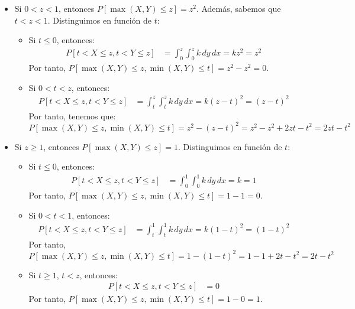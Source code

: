 \documentclass[12pt]{article}
\begin{document}
\begin{ejercicio}
\begin{enumerate}
\begin{itemize}
\begin{itemize}
                    \item Si $0<z<1$, entonces $P[\max(X,Y)\leq z]=z^2$. Además, sabemos que $t<z<1$. Distinguimos en función de $t$:
                    \begin{itemize}
                        \item Si $t\leq 0$, entonces:
                        \begin{align*}
                            P[t<X\leq z,t<Y\leq z]&=\int_{0}^{z}\int_{0}^{z} k \, dy \, dx = kz^2 = z^2
                        \end{align*}
                        Por tanto, $P[\max(X,Y)\leq z,\min(X,Y)\leq t]=z^2-z^2=0$.
                        \item Si $0<t<z$, entonces:
                        \begin{align*}
                            P[t<X\leq z,t<Y\leq z]&=\int_{t}^{z}\int_{t}^{z} k \, dy \, dx = k(z-t)^2 = (z-t)^2
                        \end{align*}
                        Por tanto, tenemos que:
                        $$P[\max(X,Y)\leq z,\min(X,Y)\leq t]=z^2-(z-t)^2=z^2-z^2+2zt-t^2=2zt-t^2$$
                    \end{itemize}
                    \item Si $z\geq 1$, entonces $P[\max(X,Y)\leq z]=1$. Distinguimos en función de $t$:
                    \begin{itemize}
                        \item Si $t\leq 0$, entonces:
                        \begin{align*}
                            P[t<X\leq z,t<Y\leq z]&=\int_{0}^{1}\int_{0}^{1} k \, dy \, dx = k = 1
                        \end{align*}
                        Por tanto, $P[\max(X,Y)\leq z,\min(X,Y)\leq t]=1-1=0$.
                        \item Si $0<t<1$, entonces:
                        \begin{align*}
                            P[t<X\leq z,t<Y\leq z]&=\int_{t}^{1}\int_{t}^{1} k \, dy \, dx = k(1-t)^2 = (1-t)^2
                        \end{align*}
                        Por tanto, $$P[\max(X,Y)\leq z,\min(X,Y)\leq t]=1-(1-t)^2=1-1+2t-t^2=2t-t^2$$
                        \item Si $t\geq 1$, $t<z$, entonces:
                        \begin{align*}
                            P[t<X\leq z,t<Y\leq z]&=0
                        \end{align*}
                        Por tanto, $P[\max(X,Y)\leq z,\min(X,Y)\leq t]=1-0=1$.
                    \end{itemize}
                \end{itemize}
            \end{itemize}
            

\end{enumerate}
\end{ejercicio}
\end{document}

